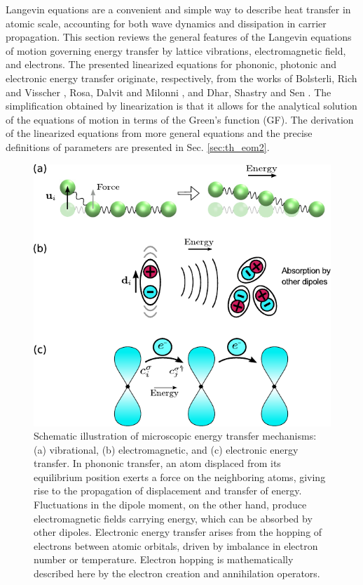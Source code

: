 Langevin equations are a convenient and simple way to describe heat transfer in atomic scale, accounting for both wave dynamics and dissipation in carrier propagation. This section reviews the general features of the Langevin equations of motion governing energy transfer by lattice vibrations, electromagnetic field, and electrons. The presented linearized equations for phononic, photonic and electronic energy transfer originate, respectively, from the works of Bolsterli, Rich and Visscher \cite{bolsterli70}, Rosa, Dalvit and Milonni \cite{rosa10,rosa11}, and Dhar, Shastry and Sen \cite{dhar03,dhar06b}. The simplification obtained by linearization is that it allows for the analytical solution of the equations of motion in terms of the Green's function (GF). The derivation of the linearized equations from more general equations and the precise definitions of parameters are presented in Sec. \ref{sec:th_eom2}. 

\begin{figure}
 \begin{center}
 \end{center}
  \includegraphics[width=.99\columnwidth]{inkscape/mechanisms.pdf}
 \caption{Schematic illustration of microscopic energy transfer mechanisms: (a) vibrational, (b) electromagnetic, and (c) electronic energy transfer. In phononic transfer, an atom displaced from its equilibrium position exerts a force on the neighboring atoms, giving rise to the propagation of displacement and transfer of energy. Fluctuations in the dipole moment, on the other hand, produce electromagnetic fields carrying energy, which can be absorbed by other dipoles. Electronic energy transfer arises from the hopping of electrons between atomic orbitals, driven by imbalance in electron number or temperature. Electron hopping is mathematically described here by the electron creation and annihilation operators.}
 \label{fig:mechanisms}
\end{figure}

